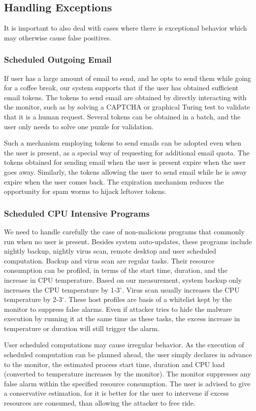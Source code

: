 \subsection{Handling Exceptions}

It is important to also deal with cases where there is exceptional
behavior which may otherwise cause false positives.

\subsubsection{Scheduled Outgoing Email}
If user has a large amount of email to send, and he opts to send them while going for a coffee break, our system supports that if the user has obtained sufficient email tokens. 
The tokens to send email are obtained by directly interacting with the monitor,
such as by solving a CAPTCHA \cite{von2003captcha} or graphical Turing test
to validate that it is a human request.
Several tokens can be obtained in a batch, and the user only needs to solve one puzzle for validation.

Such a mechanism employing tokens to send emails can be adopted even when 
the user is present, as a special way of requesting for additional email quota. The tokens obtained for sending email when the user is present expire when 
the user goes away. 
Similarly, the tokens allowing the user to send email while he is away expire when the user comes back. The expiration mechanism reduces the opportunity 
for spam worms to hijack leftover tokens.

\subsubsection{Scheduled CPU Intensive Programs}
We need to handle carefully the case of non-malicious programs that commonly
run when no user is present. Besides system auto-updates, these
programs include nightly backup, nightly virus scan, remote desktop
and user scheduled computation. Backup and virus scan are regular
tasks. Their resource consumption can be profiled, in terms of the
start time, duration, and the increase in CPU temperature. Based on
our measurement, system backup only increases the CPU temperature by
1-3$^\circ$. Virus scan usually increases the CPU temperature by
2-3$^\circ$. These host profiles are basis of a whitelist kept by
the monitor to suppress false alarms. Even if attacker tries to hide
the malware execution by running it at the same time as these tasks,
the excess increase in temperature or duration will still trigger
the alarm.

User scheduled computations may cause irregular behavior.
As the execution of scheduled computation can be planned ahead, the
user simply declares in advance to the monitor, the estimated process
start time, duration and CPU load
(converted to temperature increases by the monitor).
The monitor suppresses any
false alarm within the specified resource consumption. The user is
advised to give a conservative estimation, for it is better for the
user to intervene if excess resources are consumed, than allowing
the attacker to free ride. 
